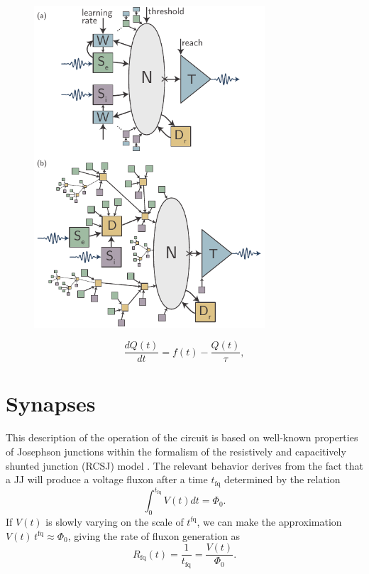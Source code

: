 \documentclass[twocolumn]{article}
\begin{document}
\begin{figure}[h!]
\includegraphics[width=8.6cm]{figures/_fig__schematics.pdf}
\end{figure}

\begin{equation}
\label{eq:leaky_integrator}
\frac{dQ(t)}{dt} = f(t)-\frac{Q(t)}{\tau},
\end{equation}


\section{\label{sec:synapses}Synapses}


This description of the operation of the circuit is based on well-known properties of Josephson junctions within the formalism of the resistively and capacitively shunted junction (RCSJ) model \cite{vatu1998,ka1999,ti1996}. The relevant behavior derives from the fact that a JJ will produce a voltage fluxon after a time $t_{\mathrm{fq}}$ determined by the relation
\begin{equation}
\label{eq:jj__fluxon_production}
\int_0^{t_{\mathrm{fq}}}V(t)dt = \Phi_0.
\end{equation}
If $V(t)$ is slowly varying on the scale of $t^{\mathrm{fq}}$, we can make the approximation $V(t)\,t^{\mathrm{fq}} \approx \Phi_0$, giving the rate of fluxon generation as
\begin{equation}
\label{eq:jj__fluxon_rate}
R_{\mathrm{fq}}(t) =  \frac{1}{t_{\mathrm{fq}}} = \frac{V(t)}{\Phi_0}.
\end{equation}
\end{document}
